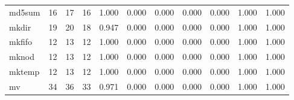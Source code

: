 \begin{longtable}{lp{1.8cm}p{1.8cm}p{1.8cm}p{1.8cm}p{1.8cm}p{1.8cm}p{1.8cm}p{1.8cm}p{1.8cm}p{1.8cm}}
md5sum    &                           16 &                 17 &                                16 &                                      1.000 &                                  0.000 &                                        0.000 &                             0.000 &                                   0.000 &                              1.000 &                                              1.000 \\
mkdir     &                           19 &                 20 &                                18 &                                      0.947 &                                  0.000 &                                        0.000 &                             0.000 &                                   0.000 &                              1.000 &                                              1.000 \\
mkfifo    &                           12 &                 13 &                                12 &                                      1.000 &                                  0.000 &                                        0.000 &                             0.000 &                                   0.000 &                              1.000 &                                              1.000 \\
mknod     &                           12 &                 13 &                                12 &                                      1.000 &                                  0.000 &                                        0.000 &                             0.000 &                                   0.000 &                              1.000 &                                              1.000 \\
mktemp    &                           12 &                 13 &                                12 &                                      1.000 &                                  0.000 &                                        0.000 &                             0.000 &                                   0.000 &                              1.000 &                                              1.000 \\
mv        &                           34 &                 36 &                                33 &                                      0.971 &                                  0.000 &                                        0.000 &                             0.000 &                                   0.000 &                              1.000 &                                              1.000 \\

\end{longtable}
